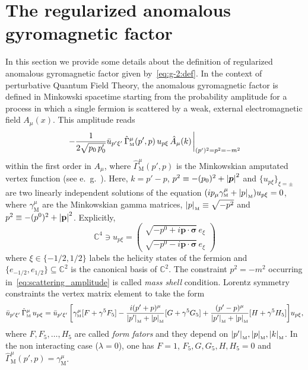 \documentclass[a4paper, 11pt]{article}
\newcommand{\C}{\mathbb{C}}
\newcommand{\mnorm}[1]			
	{\abs*{#1}_{\! \scriptscriptstyle \mathrm{M}}}			%
\newcommand{\mink}{{\scriptscriptstyle{\mathrm{M}}}}		%
\theoremstyle{thm}
\begin{document}
\section{The regularized anomalous gyromagnetic factor}
\label{app:g-2_definition}
In this section we provide some details about the definition of regularized anomalous gyromagnetic factor given by~\eqref{eq:g-2:def}. In the context of perturbative Quantum Field Theory, the anomalous gyromagnetic factor is defined in Minkowski spacetime starting from the probability amplitude for a process in which a single fermion is scattered by a weak, external electromagnetic field $A_\mu(x)$. This amplitude reads
\begin{equation}
\label{eq:scattering_amplitude}
- \frac{1}{2\sqrt{p_0 \, p'_0}} \bar{u}_{p' \xi'} \, \hat{\Gamma}^\mu_\mink(p', p) \, u_{p \xi} \, \hat{A}_\mu(k) \eval_{(p')^2 = p^2 = - m^2}
\end{equation}
within the first order in $A_\mu$, where $\hat{\Gamma}^\mu_\mink(p', p)$ is the Minkowskian amputated vertex function (see e.\ g.~\cite[Equation (6.30)]{Peskin_1995}). Here, $k = p' - p$, $p^2 \equiv -(p_0)^2 + \abs{\bm{p}}^2$ and $\lbrace u_{p \xi} \rbrace_{\xi = \pm}$ are two linearly independent solutions of the equation $(i p_\mu \gamma^\mu_\mink + \mnorm{p}) u_{p \xi} = 0$, where $\gamma^\mu_\mink$ are the Minkowskian gamma matrices, $\mnorm{p} \equiv \sqrt{-p^2}$ and $p^2 \equiv -(p^0)^2 + \abs{\mathbf{p}}^2$. Explicitly,
\begin{equation}
\C^4 \ni u_{p \xi} = 
\begin{pmatrix}
\sqrt{-p^0 + i\mathbf{p} \cdot \bm{\sigma}} \, e_\xi \\
\sqrt{-p^0 - i\mathbf{p} \cdot \bm{\sigma}} \, e_\xi
\end{pmatrix}
\end{equation}
where $\xi \in \lbrace -1/2, 1/2 \rbrace$ labels the helicity states of the fermion and $\lbrace e_{-1/2}, e_{1/2} \rbrace \subseteq \C^2$ is the canonical basis of $\C^2$. The constraint $p^2=-m^2$ occurring in~\eqref{eq:scattering_amplitude} is called \emph{mass shell} condition. 
Lorentz symmetry constraints the vertex matrix element to take the form~\cite{Nowakowski_2005}
\begin{equation}
\label{eq:vertex_parametrization}
\bar{u}_{p' \xi'} \, \hat{\Gamma}^\mu_\mink \, u_{p \xi} =
\bar{u}_{p' \xi'} \, 
\biggl[ \gamma^\mu_\mink [F + \gamma^5 F_5]- \frac{i(p'+p)^\mu}{\mnorm{p'}+\mnorm{p}} [G + \gamma^5 G_5]
+\frac{(p'-p)^\mu}{\mnorm{p'}+\mnorm{p}} [H + \gamma^5 H_5] \biggr] u_{p \xi},
\end{equation}
where $F, F_5, \dots, H_5$ are called \emph{form fators} and they depend on $\mnorm{p'}, \mnorm{p}, \mnorm{k}$. In the non interacting case ($\lambda=0$), one has  $F=1$, $F_5, G, G_5, H, H_5 = 0$ and $\hat{\Gamma}^\mu_\mink(p', p) = \gamma^\mu_\mink$. 
\end{document}
